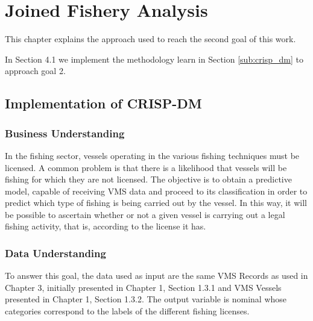 % 
% 
%
\chapter{Joined Fishery Analysis}
\label{cha:server}
This chapter explains the approach used to reach the second goal of this work. 

In Section 4.1 we implement the methodology learn in Section \ref{sub:crisp_dm} to approach  goal 2.



\section{Implementation of CRISP-DM} %
\label{sub:implementation}

\subsection{Business Understanding} %
\label{sub:business_understanding}

In the fishing sector, vessels operating in the various fishing techniques must be licensed.
A common problem is that there is a likelihood that vessels will be fishing for which they are not licensed. The objective is to obtain a predictive model, capable of receiving VMS data and proceed to its classification in order to predict which type of fishing is being carried out by the vessel. In this way, it will be possible to ascertain whether or not a given vessel is carrying out a legal fishing activity, that is, according to the license it has.





\subsection{Data Understanding} %
\label{sub:data_understanding}

To answer this goal, the data used as input are the same VMS Records as used in Chapter 3, initially presented in Chapter 1, Section 1.3.1 and VMS Vessels presented in Chapter 1, Section 1.3.2. The output variable is nominal whose categories correspond to the labels of the different fishing licenses.




